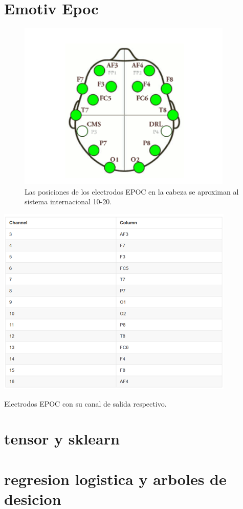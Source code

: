 \section{Emotiv Epoc}

\begin{figure}
    \centering
    \includegraphics[scale=1]{figuras/Imagen3.png}
    \caption{Las posiciones de los electrodos EPOC en la cabeza se aproximan al sistema internacional 10-20.}
    \label{fig:my_label}
\end{figure}

\begin{table}
    \centering
    \includegraphics[scale=1]{figuras/Imagen4.png}
    \caption{Electrodos EPOC con su canal de salida respectivo.}
    \label{tab:my_label}
\end{table}

\section{tensor y sklearn}

\section{regresion logistica y arboles de desicion}